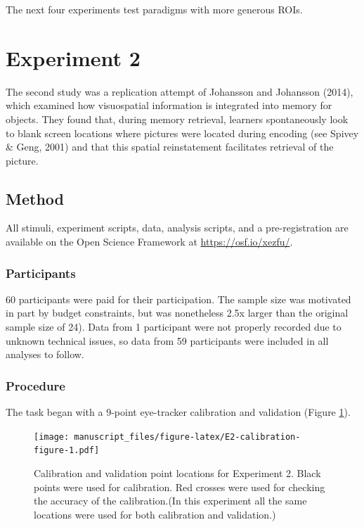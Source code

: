 \documentclass[
  man,floatsintext]{apa6}
\begin{document}
The next four experiments test paradigms with more generous ROIs.

\section{Experiment 2}\label{experiment-2}

The second study was a replication attempt of Johansson and Johansson (2014),
which examined how visuospatial information is integrated into memory
for objects. They found that, during memory retrieval, learners
spontaneously look to blank screen locations where pictures were located
during encoding (see Spivey \& Geng, 2001) and that
this spatial reinstatement facilitates retrieval of the picture.

\subsection{Method}\label{method-1}

All stimuli, experiment scripts, data, analysis scripts, and a
pre-registration are available on the Open Science Framework at
\url{https://osf.io/xezfu/}.

\subsubsection{Participants}\label{participants-2}

60 participants were paid for their participation.
The sample size was motivated in part by budget constraints, but was
nonetheless 2.5x larger than the original sample size of 24).
Data from 1 participant were not properly
recorded due to unknown technical issues, so data from 59 participants
were included in all analyses to follow.

\subsubsection{Procedure}\label{procedure-1}

The task began with a 9-point eye-tracker calibration
and validation (Figure \ref{fig:E2-calibration-figure}).

\begin{figure}
\centering
\texttt{[image: manuscript\_files/figure-latex/E2-calibration-figure-1.pdf]}
\caption{\label{fig:E2-calibration-figure}Calibration and validation point locations for Experiment 2. Black points were used for calibration. Red crosses were used for checking the accuracy of the calibration.(In this experiment all the same locations were used for both calibration and validation.)}
\end{figure}
\end{document}
